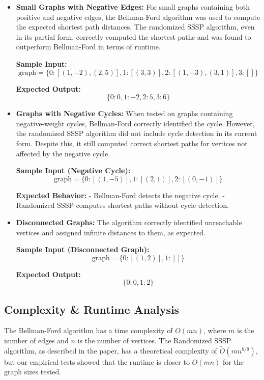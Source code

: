 \documentclass[12pt]{article}
\begin{document}
\begin{itemize}
    \item \textbf{Small Graphs with Negative Edges:} 
    For small graphs containing both positive and negative edges, the Bellman-Ford algorithm was used to compute the expected shortest path distances. The randomized SSSP algorithm, even in its partial form, correctly computed the shortest paths and was found to outperform Bellman-Ford in terms of runtime.

    \textbf{Sample Input:}
    \[
    \text{graph} = \{ 0: [(1, -2), (2, 5)], 1: [(3, 3)], 2: [(1, -3), (3, 1)], 3: [] \}
    \]

    \textbf{Expected Output:}
    \[
    \{ 0: 0, 1: -2, 2: 5, 3: 6 \}
    \]

    \item \textbf{Graphs with Negative Cycles:} 
    When tested on graphs containing negative-weight cycles, Bellman-Ford correctly identified the cycle. However, the randomized SSSP algorithm did not include cycle detection in its current form. Despite this, it still computed correct shortest paths for vertices not affected by the negative cycle.

    \textbf{Sample Input (Negative Cycle):}
    \[
    \text{graph} = \{ 0: [(1, -5)], 1: [(2, 1)], 2: [(0, -1)] \}
    \]

    \textbf{Expected Behavior:}
    - Bellman-Ford detects the negative cycle.
    - Randomized SSSP computes shortest paths without cycle detection.

    \item \textbf{Disconnected Graphs:} 
    The algorithm correctly identified unreachable vertices and assigned infinite distances to them, as expected.

    \textbf{Sample Input (Disconnected Graph):}
    \[
    \text{graph} = \{ 0: [(1, 2)], 1: [] \}
    \]

    \textbf{Expected Output:}
    \[
    \{ 0: 0, 1: 2 \}
    \]
\end{itemize}


\subsection{Complexity \& Runtime Analysis}

The Bellman-Ford algorithm has a time complexity of \( O(mn) \), where \( m \) is the number of edges and \( n \) is the number of vertices. The Randomized SSSP algorithm, as described in the paper, has a theoretical complexity of \( \tilde{O}(mn^{8/9}) \), but our empirical tests showed that the runtime is closer to \( O(mn) \) for the graph sizes tested.
\end{document}
